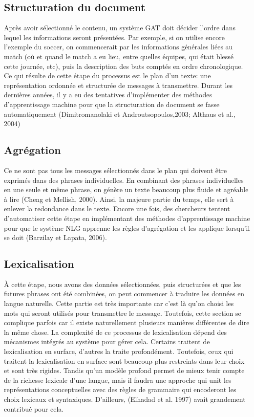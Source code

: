 \subsection{Structuration du document}
Après avoir sélectionné le contenu, un système \ac{GAT} doit décider l'ordre dans lequel les informations seront présentées. Par exemple, si on utilise encore l'exemple du soccer, on commencerait par les informations générales liées au match (où et quand le match a eu lieu, entre quelles équipes, qui était blessé cette journée, etc), puis la description des buts comptés en ordre chronologique. Ce qui résulte de cette étape du processus est le plan d'un texte: une représentation ordonnée et structurée de messages à transmettre. Durant les dernières années, il y a eu des tentatives d'implémenter des méthodes d'apprentissage machine pour que la structuration de document se fasse automatiquement (Dimitromanolaki et Androutsopoulos,2003; Althaus et al., 2004)

\subsection{Agrégation}
Ce ne sont pas tous les messages sélectionnés dans le plan qui doivent être exprimés dans des phrases individuelles. En combinant des phrases individuelles en une seule et même phrase, on génère un texte beaucoup plus fluide et agréable à lire (Cheng et Mellish, 2000). Ainsi, la majeure partie du temps, elle sert à enlever la redondance dans le texte. Encore une fois, des chercheurs tentent d'automatiser cette étape en implémentant des méthodes d'apprentissage machine pour que le système NLG apprenne les règles d'agrégation et les applique lorsqu'il se doit (Barzilay et Lapata, 2006).

\subsection{Lexicalisation}
À cette étape, nous avons des données sélectionnées, puis structurées et que les futures phrases ont été combinées, on peut commencer à traduire les données en langue naturelle. Cette partie est très importante car c'est là qu'on choisi les mots qui seront utilisés pour transmettre le message. Toutefois, cette section se complique parfois car il existe naturellement plusieurs manières différentes de dire la même chose. La complexité de ce processus de lexicalisation dépend des mécanismes intégrés au système pour gérer cela. Certains traitent de lexicalisation en surface, d'autres la traite profondément. Toutefois, ceux qui traitent la lexicalisation en surface sont beaucoup plus restreints dans leur choix et sont très rigides. Tandis qu'un modèle profond permet de mieux tenir compte de la richesse lexicale d'une langue, mais il faudra une approche qui unit les représentations conceptuelles avec des règles de grammaire qui encoderont les choix lexicaux et syntaxiques. D'ailleurs, (Elhadad et al. 1997) avait grandement contribué pour cela.

